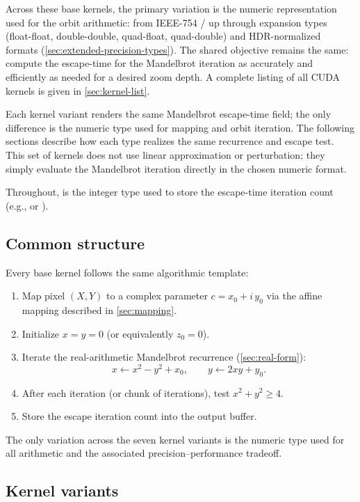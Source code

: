 Across these base kernels, the primary variation is the numeric representation
used for the orbit arithmetic: from IEEE-754 / up
through expansion types (float-float, double-double, quad-float, quad-double)
and HDR-normalized formats (\cref{sec:extended-precision-types}). The shared objective remains the same: compute the
escape-time for the Mandelbrot iteration as accurately and efficiently as needed
for a desired zoom depth.  A complete listing of all CUDA kernels is given in
\cref{sec:kernel-list}.

Each kernel variant renders the same Mandelbrot escape-time field; the only
difference is the numeric type used for mapping and orbit iteration. The
following sections describe how each type realizes the same recurrence and
escape test.  This set of kernels does not use linear approximation or
perturbation; they simply evaluate the Mandelbrot iteration directly in the
chosen numeric format.

Throughout,  is the integer type used to store the escape-time
iteration count (e.g.,  or ).

\subsection{Common structure}

Every base kernel follows the same algorithmic template:
\begin{enumerate}
  \item Map pixel \((X,Y)\) to a complex parameter \(c = x_0 + i\,y_0\)
        via the affine mapping described in \cref{sec:mapping}.
  \item Initialize \(x = y = 0\) (or equivalently \(z_0 = 0\)).
  \item Iterate the real-arithmetic Mandelbrot recurrence (\cref{sec:real-form}):
        \[
          x \leftarrow x^2 - y^2 + x_0,\qquad y \leftarrow 2xy + y_0.
        \]
  \item After each iteration (or chunk of iterations), test \(x^2 + y^2 \ge 4\).
  \item Store the escape iteration count into the output buffer.
\end{enumerate}
The only variation across the seven kernel variants is the numeric type used for
all arithmetic and the associated precision--performance tradeoff.

\subsection{Kernel variants}

